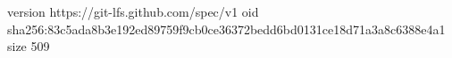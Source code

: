 version https://git-lfs.github.com/spec/v1
oid sha256:83c5ada8b3e192ed89759f9cb0ce36372bedd6bd0131ce18d71a3a8c6388e4a1
size 509
